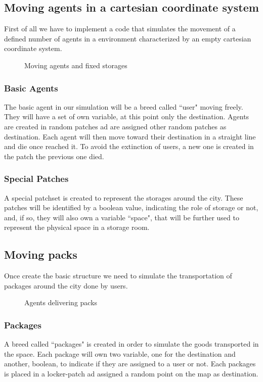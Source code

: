 \documentclass[11pt,a4paper]{article}
\begin{document}
\subsection{Moving agents in a cartesian coordinate system}
First of all we have to implement a code that simulates the movement of a defined number of agents in a environment characterized by an empty cartesian coordinate system. 

\begin{figure}[h!]
\centering
\caption{Moving agents and fixed storages}
\end{figure}

\subsubsection*{Basic Agents}
The basic agent in our simulation will be a breed called “user" moving freely.
They will have a set of own variable, at this point only the destination.
Agents are created in random patches ad are assigned other random patches as destination.
Each agent will then move toward their destination in a straight line and die once reached it.
To avoid the extinction of users, a new one is created in the patch the previous one died.

\subsubsection*{Special Patches}
A special patchset is created to represent the storages around the city.
These patches will be identified by a boolean value, indicating the role of storage or not, and, if so, they will also own a variable “space", that will be further used to represent the physical space in a storage room.

\newpage
\subsection{Moving packs}
Once create the basic structure we need to simulate the transportation of packages around the city done by users.
\medskip
\begin{figure}[h!]
\centering
\caption{Agents delivering packs}
\end{figure}
\medskip
\subsubsection*{Packages}
A breed called “packages" is created in order to simulate the goods transported in the space. Each package will own two variable, one for the destination and another, boolean, to indicate if they are assigned to a user or not.
Each packages is placed in a locker-patch ad assigned a random point on the map as destination.
\end{document}
